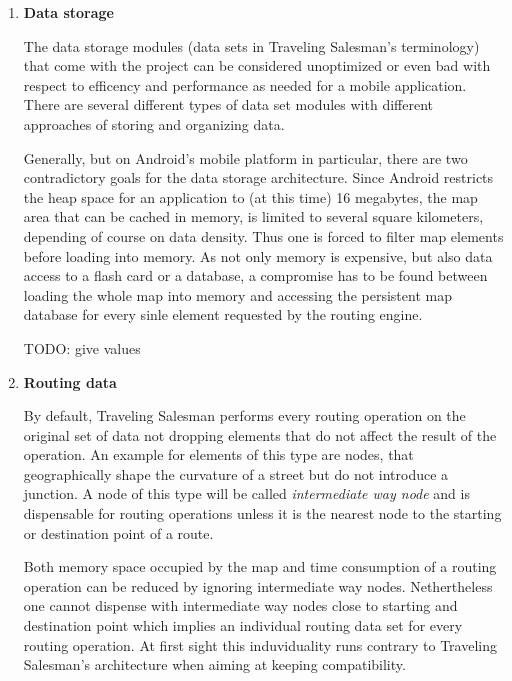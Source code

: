 \begin{enumerate}
	\item \textbf{Data storage}
	
		The data storage modules (data sets in Traveling Salesman's terminology) that come with the project can be considered unoptimized or even bad with respect to efficency and performance as needed for a mobile application. There are several different types of data set modules with different approaches of storing and organizing data.\newline
		
		Generally, but on Android's mobile platform in particular, there are two contradictory goals for the data storage architecture. Since Android restricts the heap space for an application to (at this time) 16 megabytes, the map area that can be cached in memory, is limited to several square kilometers, depending of course on data density. Thus one is forced to filter map elements before loading into memory.
		As not only memory is expensive, but also data access to a flash card or a database, a compromise has to be found between loading the whole map into memory and accessing the persistent map database for every sinle element requested by the routing engine. \newline
		
		TODO: give values
		
	\item \textbf{Routing data}
	
		By default, Traveling Salesman performs every routing operation on the original set of data not dropping elements that do not affect the result of the operation. An example for elements of this type are nodes, that geographically shape the curvature of a street but do not introduce a junction. A node of this type will be called \emph{intermediate way node} and is dispensable for routing operations unless it is the nearest node to the starting or destination point of a route.\newline
		
		Both memory space occupied by the map and time consumption of a routing operation can be reduced by ignoring intermediate way nodes. Nethertheless one cannot dispense with intermediate way nodes close to starting and destination point which implies an individual routing data set for every routing operation. At first sight this induviduality runs contrary to Traveling Salesman's architecture when aiming at keeping compatibility.\newline			
		

\end{enumerate}
